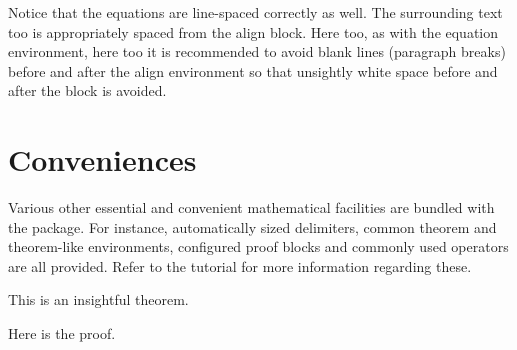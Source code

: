 Notice that the equations are line-spaced correctly as well. The surrounding 
text too is appropriately spaced from the {\ttfamily align} block. Here too, as 
with the equation environment, here too it is recommended to avoid blank lines 
(paragraph breaks) before and after the {\ttfamily align} environment so that 
unsightly white space before and after the block is avoided.

\section{Conveniences}
Various other essential and convenient mathematical facilities are bundled with
the package. For instance, automatically sized delimiters, common theorem and
theorem-like environments, configured proof blocks and commonly used operators
are all provided. Refer to the tutorial for more information regarding these.
\begin{theorem}
This is an insightful theorem.
\end{theorem}
\begin{Proof}
Here is the proof.
\end{Proof}